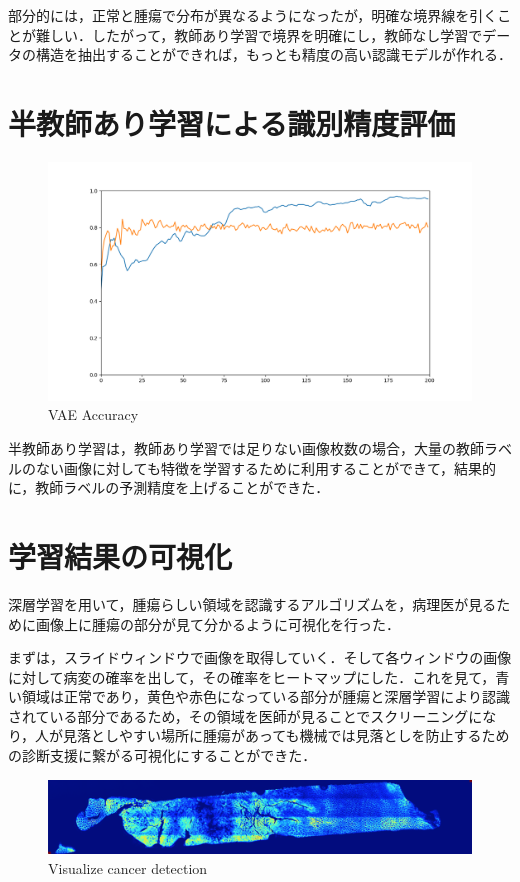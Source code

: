 部分的には，正常と腫瘍で分布が異なるようになったが，明確な境界線を引くことが難しい．したがって，教師あり学習で境界を明確にし，教師なし学習でデータの構造を抽出することができれば，もっとも精度の高い認識モデルが作れる．

\section{半教師あり学習による識別精度評価}
\begin{figure}
	\centering
	\includegraphics[width=0.7\linewidth]{fig/chapter4/accuracy_summary}
	\caption{VAE Accuracy}
	\label{fig:accuracysummary}
\end{figure}

半教師あり学習は，教師あり学習では足りない画像枚数の場合，大量の教師ラベルのない画像に対しても特徴を学習するために利用することができて，結果的に，教師ラベルの予測精度を上げることができた．


\section{学習結果の可視化}
深層学習を用いて，腫瘍らしい領域を認識するアルゴリズムを，病理医が見るために画像上に腫瘍の部分が見て分かるように可視化を行った．


まずは，スライドウィンドウで画像を取得していく．そして各ウィンドウの画像に対して病変の確率を出して，その確率をヒートマップにした．これを見て，青い領域は正常であり，黄色や赤色になっている部分が腫瘍と深層学習により認識されている部分であるため，その領域を医師が見ることでスクリーニングになり，人が見落としやすい場所に腫瘍があっても機械では見落としを防止するための診断支援に繋がる可視化にすることができた．

\begin{figure}
	\centering
	\includegraphics[width=0.7\linewidth]{fig/chapter4/visualization/sample_B}
	\caption{Visualize cancer detection}
	\label{fig:sampleb}
\end{figure}

